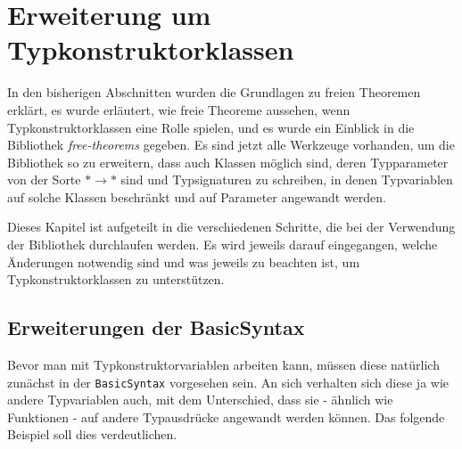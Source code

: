 \section{Erweiterung um Typkonstruktorklassen}

\label{sec:erweiterung-um-typklassen}

In den bisherigen Abschnitten wurden die Grundlagen zu freien Theoremen erklärt, es wurde erläutert, wie freie Theoreme
aussehen, wenn Typkonstruktorklassen eine Rolle spielen, und es wurde ein Einblick in die Bibliothek \textit{free-theorems}
gegeben. Es sind jetzt alle Werkzeuge vorhanden, um die Bibliothek so zu erweitern, dass auch Klassen möglich sind,
deren Typparameter von der Sorte $* \rightarrow *$ sind und Typsignaturen zu schreiben, in denen Typvariablen auf
solche Klassen beschränkt und auf Parameter angewandt werden.

Dieses Kapitel ist aufgeteilt in die verschiedenen Schritte, die bei der Verwendung der Bibliothek durchlaufen werden. Es
wird jeweils darauf eingegangen, welche Änderungen notwendig sind und was jeweils zu beachten ist, um Typkonstruktorklassen
zu unterstützen.

%


\subsection{Erweiterungen der BasicSyntax}

Bevor man mit Typkonstruktorvariablen arbeiten kann, müssen diese natürlich zunächst in der \texttt{BasicSyntax} vorgesehen
sein. An sich verhalten sich diese ja wie andere Typvariablen auch, mit dem Unterschied, dass sie - ähnlich wie Funktionen -
auf andere Typausdrücke angewandt werden können. Das folgende Beispiel soll dies verdeutlichen.



